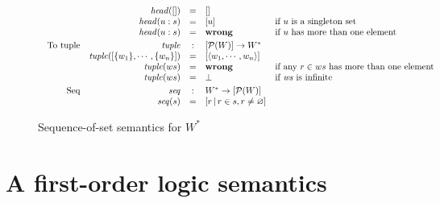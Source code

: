 \documentclass[acmsmall,review,dvipsnames]{acmart}
\newcommand{\Varid}[1]{\mathit{#1}}
\newcommand{\tuple}[1]{\langle #1 \rangle}
\newcommand{\Value}{W}
\newcommand{\mtype}{\Value^{*}}
\newcommand{\wrong}{\mathbf{wrong}}
\begin{document}
\begin{figure}
$$\begin{array}{l}
\begin{array}{rrcll}
& \shead([])  & = & [] \\
& \shead(u:s) & = & [u] & \text{if $u$ is a singleton set} \\
& \shead(u:s) & = & \wrong & \text{if $u$ has more than one element}\\[1mm]
\text{To tuple} & \stuple & : & [\powersett{W}] \rightarrow \mtype \\
     & \stuple([\{w_1\}, \cdots, \{w_n\}]) & = & [\tuple{w_1,\cdots,w_n}] \\
     & \stuple(ws) & = & \wrong & \text{if any $r \in ws$ has more than one element} \\
     & \stuple(ws) & = & \bot & \text{if \ensuremath{\Varid{ws}} is infinite} \\[1mm]
\text{Seq} & \sseq & : & \mtype \rightarrow [\powersett{W}] \\
     & \sseq(s) & = & [ r \, \vert \, r \in s, r \not= \varnothing ] \\
\end{array}
\end{array}
$$
\caption{Sequence-of-set semantics for $\mtype$}
\label{fig:sequence-of-set-sem}
\end{figure}

\section{A first-order logic semantics}
\end{document}
